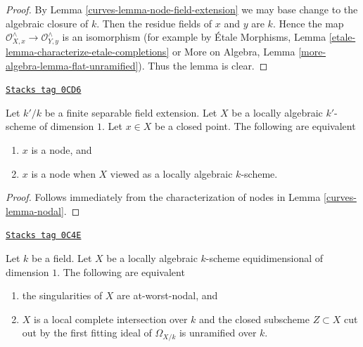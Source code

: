 \begin{proof}

By Lemma \ref{curves-lemma-node-field-extension}
we may base change to the algebraic closure of $k$.
Then the residue fields of $x$ and $y$ are $k$.
Hence the map $\mathcal{O}_{X, x}^\wedge \to \mathcal{O}_{Y, y}^\wedge$
is an isomorphism (for example by
\'Etale Morphisms, Lemma \ref{etale-lemma-characterize-etale-completions} or
More on Algebra, Lemma \ref{more-algebra-lemma-flat-unramified}).
Thus the lemma is clear.
\end{proof}

\begin{lemma}
\label{curves-lemma-node-over-separable-extension}
\href{https://stacks.math.columbia.edu/tag/0CD6}{\texttt{Stacks tag 0CD6}}

Let $k'/k$ be a finite separable field extension.
Let $X$ be a locally algebraic $k'$-scheme of dimension $1$.
Let $x \in X$ be a closed point. The following are equivalent
\begin{enumerate}
\item $x$ is a node, and
\item $x$ is a node when $X$ viewed as a locally algebraic $k$-scheme.
\end{enumerate}
\end{lemma}

\begin{proof}

Follows immediately from the characterization of nodes in
Lemma \ref{curves-lemma-nodal}.
\end{proof}

\begin{lemma}
\label{curves-lemma-nodal-lci}
\href{https://stacks.math.columbia.edu/tag/0C4E}{\texttt{Stacks tag 0C4E}}

Let $k$ be a field. Let $X$ be a locally algebraic $k$-scheme
equidimensional of dimension $1$.
The following are equivalent
\begin{enumerate}
\item the singularities of $X$ are at-worst-nodal, and
\item $X$ is a local complete intersection over $k$
and the closed subscheme $Z \subset X$ cut out by the
first fitting ideal of $\Omega_{X/k}$ is unramified over $k$.
\end{enumerate}
\end{lemma}

